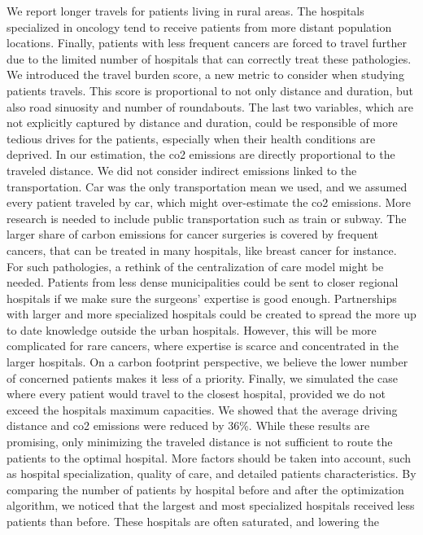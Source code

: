 We report longer travels for patients living in rural areas. The hospitals
specialized in oncology tend to receive patients from more distant population
locations. Finally, patients with less frequent cancers are forced to travel
further due to the limited number of hospitals that can correctly treat these
pathologies. We introduced the travel burden score, a new metric to consider
when studying patients travels. This score is proportional to not only distance
and duration, but also road sinuosity and number of roundabouts. The last two
variables, which are not explicitly captured by distance and duration, could be
responsible of more tedious drives for the patients, especially when their
health conditions are deprived. In our estimation, the \ac{co2} emissions are
directly proportional to the traveled distance. We did not consider indirect
emissions linked to the transportation. Car was the only transportation mean we
used, and we assumed every patient traveled by car, which might over-estimate
the \ac{co2} emissions. More research is needed to include public transportation
such as train or subway. The larger share of carbon emissions for cancer
surgeries is covered by frequent cancers, that can be treated in many hospitals,
like breast cancer for instance. For such pathologies, a rethink of the
centralization of care model might be needed. Patients from less dense
municipalities could be sent to closer regional hospitals if we make sure the
surgeons' expertise is good enough. Partnerships with larger and more
specialized hospitals could be created to spread the more up to date knowledge
outside the urban hospitals. However, this will be more complicated for rare
cancers, where expertise is scarce and concentrated in the larger hospitals. On
a carbon footprint perspective, we believe the lower number of concerned
patients makes it less of a priority. Finally, we simulated the case where every
patient would travel to the closest hospital, provided we do not exceed the
hospitals maximum capacities. We showed that the average driving distance and
\ac{co2} emissions were reduced by 36\%. While these results are promising, only
minimizing the traveled distance is not sufficient to route the patients to the
optimal hospital. More factors should be taken into account, such as hospital
specialization, quality of care, and detailed patients characteristics. By
comparing the number of patients by hospital before and after the optimization
algorithm, we noticed that the largest and most specialized hospitals received
less patients than before. These hospitals are often saturated, and lowering the
